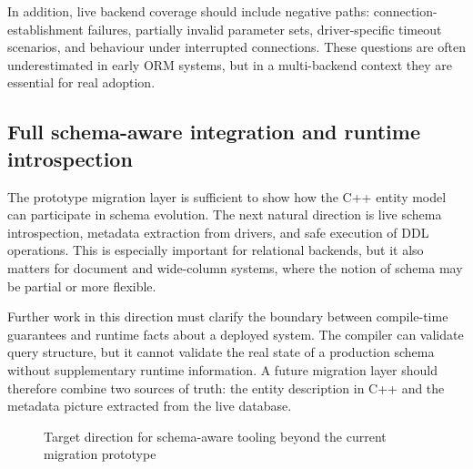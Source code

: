 In addition, live backend coverage should include negative paths: connection-establishment failures, partially invalid parameter sets, driver-specific timeout scenarios, and behaviour under interrupted connections. These questions are often underestimated in early ORM systems, but in a multi-backend context they are essential for real adoption.

\subsection{Full schema-aware integration and runtime introspection}

The prototype migration layer is sufficient to show how the C++ entity model can participate in schema evolution. The next natural direction is live schema introspection, metadata extraction from drivers, and safe execution of DDL operations. This is especially important for relational backends, but it also matters for document and wide-column systems, where the notion of schema may be partial or more flexible.

Further work in this direction must clarify the boundary between compile-time guarantees and runtime facts about a deployed system. The compiler can validate query structure, but it cannot validate the real state of a production schema without supplementary runtime information. A future migration layer should therefore combine two sources of truth: the entity description in C++ and the metadata picture extracted from the live database.

\begin{figure}[H]
\centering
{}
\caption{Target direction for schema-aware tooling beyond the current migration prototype}
\label{fig:future_schema_tooling}
\end{figure}

